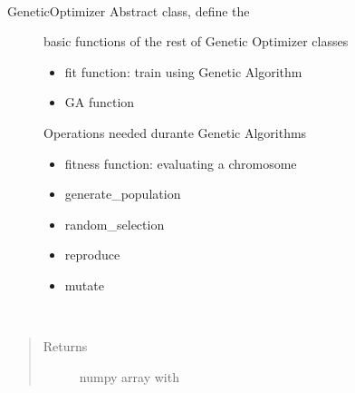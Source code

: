 \documentclass[letterpaper,10pt,english]{sphinxmanual}
\begin{document}
\begin{fulllineitems}
\label{\detokenize{index:genetic_optimizer.GeneticOptimizer}}~\begin{description}
\item[{GeneticOptimizer Abstract class, define the}] \leavevmode
basic functions of the rest of Genetic Optimizer classes
\begin{itemize}
\item {} 
fit function: train using Genetic Algorithm

\item {} 
GA function

\end{itemize}

Operations needed durante Genetic Algorithms
\begin{itemize}
\item {} 
fitness function: evaluating a chromosome

\item {} 
generate\_population

\item {} 
random\_selection

\item {} 
reproduce

\item {} 
mutate

\end{itemize}

\end{description}

\begin{fulllineitems}
\label{\detokenize{index:genetic_optimizer.GeneticOptimizer.generate_population}}~\begin{quote}\begin{description}
\item[{Returns}] \leavevmode
numpy array with

\end{description}\end{quote}

\end{fulllineitems}


\end{fulllineitems}
\end{document}
